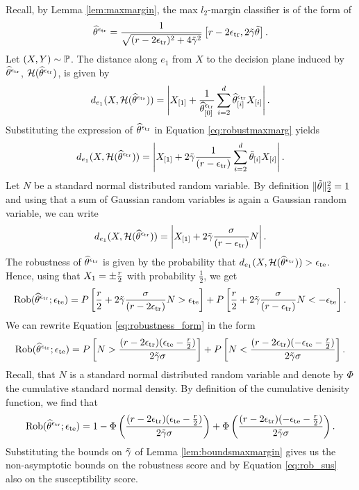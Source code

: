 Recall, by Lemma \ref{lem:maxmargin}, the max $l_2$-margin classifier is of the form of
\begin{equation}
\label{eq:robustmaxmarg}
\widehat{\theta}^{\epsilon_{\text{tr}}} = \frac{1}{\sqrt{(r-2 \epsilon_{\text{tr}})^2 + 4 \tilde{\gamma}^{2}}}\left[r-2\epsilon_{\text{tr}},  2 \tilde{\gamma} \tilde{\theta} \right].
\end{equation}
Let $(X, Y) \sim \mathbb{P}$. The distance along $e_1$ from $X$ to the decision plane induced by $\widehat{\theta}^{\epsilon_{\text{tr}}}$, $\mathcal{H}(\widehat{\theta}^{\epsilon_{\text{tr}}} )$, is given by
\begin{equation*}
d_{e_1}(X, \mathcal{H}(\widehat{\theta}^{\epsilon_{\text{tr}}})) = \left| {X}_{[1]}+ \frac{1}{ {\widehat{\theta}^{\epsilon_{\text{tr}}}}_{[0]}} \sum_{i=2}^{ d }  {\widehat{\theta}^{\epsilon_{\text{tr}}}}_{[i]} {X}_{[i]} \right|. 
\end{equation*}
Substituting the expression of $\widehat{\theta}^{\epsilon_{\text{tr}}}$ in Equation \ref{eq:robustmaxmarg} yields
\begin{equation*}
d_{e_1}(X, \mathcal{H}(\widehat{\theta}^{\epsilon_{\text{tr}}})) = \left| {X}_{[1]} + 2 \tilde{\gamma} \frac{1}{(r-\epsilon_{\text{tr}})} \sum_{i=2}^{d}  {\tilde{\theta}}_{[i]}   {X}_{[i]} \right|. 
\end{equation*}
Let $N$ be a standard normal distributed random variable. By definition $\| \tilde{\theta}\|_2^2 = 1$ and using that a sum of Gaussian random variables is again a Gaussian random variable, we can write 
\begin{equation*}
d_{e_1}(X,\mathcal{H}(\widehat{\theta}^{\epsilon_{\text{tr}}})) = \left| {X}_{[1]} + 2 \tilde{\gamma} \frac{\sigma}{(r-\epsilon_{\text{tr}})} N \right|. 
\end{equation*}
The robustness of $\widehat{\theta}^{\epsilon_{\text{tr}}}$ is given by the probability that $d_{e_1}(X,\mathcal{H}(\widehat{\theta}^{\epsilon_{\text{tr}}})) > \epsilon_{\text{te}}$. Hence, using that $X_1 = \pm \frac{r}{2}$ with probability $\frac{1}{2}$, we get
\begin{equation}
\label{eq:robustness_form}
\text{Rob}(\widehat{\theta}^{\epsilon_{\text{tr}}};\epsilon_{\text{te}}) = P\left[ \frac{r}{2} + 2 \tilde{\gamma} \frac{\sigma}{(r-2\epsilon_{\text{tr}})}  N > \epsilon_{\text{te}} \right] + P \left[ \frac{r}{2} + 2 \tilde{\gamma} \frac{\sigma}{(r-\epsilon_{\text{tr}})}  N < -\epsilon_{\text{te}} \right].
\end{equation}
We can rewrite Equation \ref{eq:robustness_form} in the form
\begin{equation*}
\text{Rob}(\widehat{\theta}^{\epsilon_{\text{tr}}};\epsilon_{\text{te}})  = P \left[ N > \frac{(r-2\epsilon_{\text{tr}}) (\epsilon_{\text{te}} - \frac{r}{2})}{2 \tilde{\gamma}\sigma} \right] + P \left[  N <  \frac{(r-2\epsilon_{\text{tr}})( -\epsilon_{\text{te}} -\frac{ r}{2})}{2 \tilde{\gamma}\sigma} \right].
\end{equation*}
Recall, that $N$ is a standard normal distributed random variable and denote by $\Phi$ the cumulative standard normal density. By definition of the cumulative denisity function, we find that
\begin{equation*}
\text{Rob}(\widehat{\theta}^{\epsilon_{\text{tr}}};\epsilon_{\text{te}}) = 1 - \Phi \left(\frac{(r-2\epsilon_{\text{tr}}) (\epsilon_{\text{te}} - \frac{r}{2})}{2 \tilde{\gamma}\sigma}\right) + \Phi \left( \frac{(r-2 \epsilon_{\text{tr}})( -\epsilon_{\text{te}} - \frac{r}{2})}{2 \tilde{\gamma}\sigma} \right).
\end{equation*}
Substituting the bounds on $\tilde{\gamma}$ of Lemma \ref{lem:boundsmaxmargin} gives us the non-asymptotic bounds on the robustness score and by Equation \ref{eq:rob_sus} also on the susceptibility score.  


